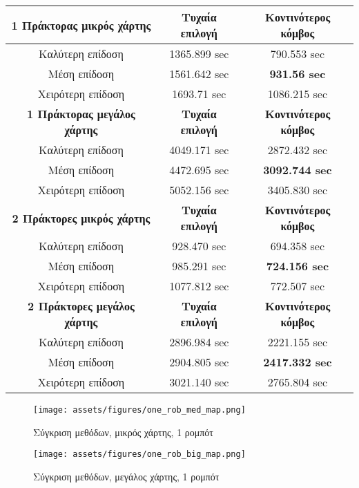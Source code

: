 \begingroup
\centering
\begin{tabular}{c | c | c }
	\textbf{1 Πράκτορας μικρός χάρτης} & \textbf{Τυχαία επιλογή} & \textbf{Κοντινότερος κόμβος} \\ \hline
	Καλύτερη επίδοση & 1365.899 sec & 790.553 sec \\ \hline
	Μέση επίδοση & 1561.642 sec  & \textbf{931.56 sec}   \\ \hline
	Χειρότερη επίδοση & 1693.71 sec & 1086.215 sec \\
	\textbf{1 Πράκτορας μεγάλος χάρτης} & \textbf{Τυχαία επιλογή} & \textbf{Κοντινότερος κόμβος}\\ \hline
	Καλύτερη επίδοση & 4049.171 sec & 2872.432 sec \\ \hline
	Μέση επίδοση & 4472.695 sec   & \textbf{3092.744 sec}   \\ \hline
	Χειρότερη επίδοση & 5052.156 sec & 3405.830 sec \\
	\textbf{2 Πράκτορες μικρός χάρτης} & \textbf{Τυχαία επιλογή} & \textbf{Κοντινότερος κόμβος} \\ \hline
	Καλύτερη επίδοση & 928.470 sec & 694.358 sec \\ \hline
	Μέση επίδοση & 985.291 sec & \textbf{ 724.156 sec}   \\ \hline
	Χειρότερη επίδοση & 1077.812 sec & 772.507 sec \\ 
	\textbf{2 Πράκτορες μεγάλος χάρτης} & \textbf{Τυχαία επιλογή} & \textbf{Κοντινότερος κόμβος}\\ \hline
	Καλύτερη επίδοση & 2896.984 sec & 2221.155 sec \\ \hline
	Μέση επίδοση & 2904.805 sec  & \textbf{2417.332 sec}   \\ \hline
	Χειρότερη επίδοση & 3021.140 sec & 2765.804 sec \\ 
	
	
	
\end{tabular}
\endgroup

\begin{figure}[!h]
	\centering
	\texttt{[image: assets/figures/one\_rob\_med\_map.png]}
	\caption{Σύγκριση μεθόδων, μικρός χάρτης, 1 ρομπότ}
\end{figure}

\newpage

\begin{figure}[!h]
	\centering
	\texttt{[image: assets/figures/one\_rob\_big\_map.png]}
	\caption{Σύγκριση μεθόδων, μεγάλος χάρτης, 1 ρομπότ}
\end{figure}

